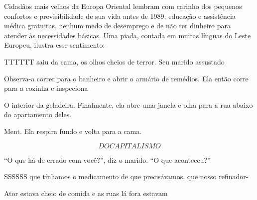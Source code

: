  \par 
Cidadãos mais velhos da Europa Oriental lembram com carinho dos pequenos confortos e previsibilidade de sua vida antes de 1989: educação e assistência médica gratuitas, nenhum medo de desemprego e de não ter dinheiro para atender às necessidades básicas. Uma piada, contada em muitas línguas do Leste Europeu, ilustra esse sentimento:
 \par 
TTTTTT saiu da cama, os olhos cheios de terror. Seu marido assustado
 \par 
Observa-a correr para o banheiro e abrir o armário de remédios. Ela então corre para a cozinha e inspeciona
 \par 
O interior da geladeira. Finalmente, ela abre uma janela e olha para a rua abaixo do apartamento deles.
 \par 
Ment. Ela respira fundo e volta para a cama.
 \par 
\[DO CAPITALISMO\]
 \par 
“O que há de errado com você?”, diz o marido. “O que aconteceu?”
 \par 
SSSSSS que tínhamos o medicamento de que precisávamos, que nosso refinador-
 \par 
Ator estava cheio de comida e as ruas lá fora estavam
 \par 
